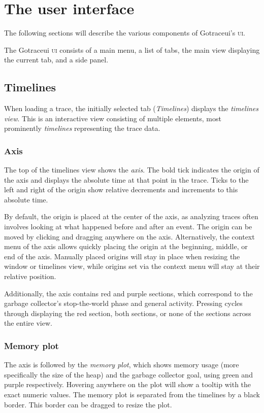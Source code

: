 \documentclass[10pt,letterpaper,oneside,openany,english]{memoir}
\newcommand{\noun}[1]{{\emph{#1}}}
\begin{document}
\chapter{The user interface}
The following sections will describe the various components of Gotraceui's \textsc{ui}.

The Gotraceui \textsc{ui} consists of a main menu, a list of tabs, the main view displaying the current tab, and a side panel.

\section{Timelines}
When loading a trace, the initially selected tab (\emph{Timelines}) displays the \noun{timelines view}.
This is an interactive view consisting of multiple elements, most prominently \noun{timelines} representing the trace data.

\subsection{Axis}
The top of the timelines view shows the \noun{axis}.
The bold tick indicates the origin of the axis and displays the absolute time at that point in the trace.
Ticks to the left and right of the origin show relative decrements and increments to this absolute time.

By default, the origin is placed at the center of the axis,
as analyzing traces often involves looking at what happened before and after an event.
The origin can be moved by clicking and dragging anywhere on the axis.
Alternatively, the context menu of the axis allows quickly placing the origin at the beginning, middle, or end of the axis.
Manually placed origins will stay in place when resizing the window or timelines view,
while origins set via the context menu will stay at their relative position.

Additionally, the axis contains red and purple sections,
which correspond to the garbage collector's stop-the-world phase and general activity.
Pressing  cycles through displaying the red section, both sections, or none of the sections across the entire view.

\subsection{Memory plot}

The axis is followed by the \noun{memory plot}, which shows memory usage (more specifically the size of the heap) and the garbage collector goal, using green and purple respectively.
Hovering anywhere on the plot will show a tooltip with the exact numeric values.
The memory plot is separated from the timelines by a black border.
This border can be dragged to resize the plot.
\end{document}
